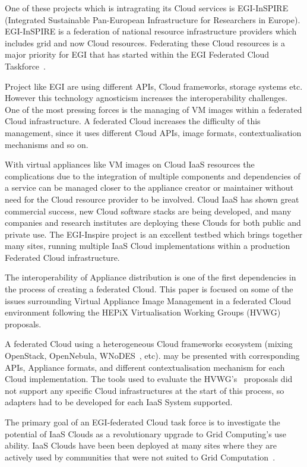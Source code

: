 \documentclass{cai}
\begin{document}
One of these projects which is intragrating its Cloud services is EGI-InSPIRE~\cite{egi} (Integrated Sustainable Pan-European Infrastructure for Researchers in Europe). EGI-InSPIRE is a federation of national resource infrastructure providers which includes grid and now Cloud resources. 
Federating these Cloud resources is a major priority for EGI that has started within the EGI Federated Cloud Taskforce~\cite{fedCloud}.

Project like EGI are using different APIs, Cloud frameworks, storage systems etc. 
However this technology agnosticism increases the interoperability challenges. One of the most pressing forces is the managing of VM images within a federated Cloud infrastructure.
A federated Cloud increases the difficulty of this management, since it uses different Cloud APIs, image formats, contextualisation mechanisms and so on. 

With virtual appliances like VM images on Cloud IaaS resources the complications due to the integration of multiple components and dependencies of a service can be managed closer to the appliance creator or maintainer without need for the Cloud resource provider to be involved. 
Cloud IaaS has shown great commercial success, new Cloud software stacks are being developed, and many companies and research institutes are deploying these Clouds for both public and private use. 
The EGI-Inspire project is an excellent testbed which brings together many sites, running multiple IaaS Cloud implementations within a production Federated Cloud infrastructure.

The interoperability of Appliance distribution is one of the first dependencies in the process of creating a federated Cloud. This paper is focused on some of the issues surrounding Virtual Appliance Image Management in a federated Cloud environment following the HEPiX Virtualisation Working Groups (HVWG)~\cite{hepix} proposals.

A federated Cloud using a heterogeneous Cloud frameworks ecosystem (mixing OpenStack, OpenNebula, WNoDES~\cite{wnodes}, etc). may be presented with corresponding APIs, Appliance formats, and different contextualisation mechanism for each Cloud implementation. 
The tools used to evaluate the HVWG's~\cite{hepix} proposals did not support any specific Cloud infrastructures at the start of this process, so adapters had to be developed for each IaaS System supported. 

The primary goal of an EGI-federated Cloud task force is to investigate the potential of IaaS Clouds as a revolutionary upgrade to Grid Computing's use ability. 
IaaS Clouds have been been deployed at many sites where they are actively used by communities that were not suited to Grid Computation~\cite{gridCloud}. 
\end{document}
